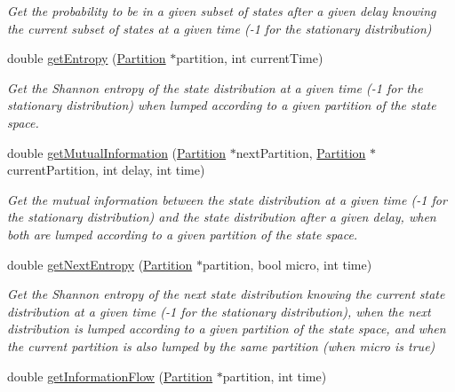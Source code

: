 \begin{DoxyCompactItemize}
\begin{DoxyCompactList}\small\item\em Get the probability to be in a given subset of states after a given delay knowing the current subset of states at a given time (-\/1 for the stationary distribution) \end{DoxyCompactList}\item 
\hypertarget{class_markov_process_ad1d295d33c8abc5bdabea3eeaf33b553}{}double \hyperlink{class_markov_process_ad1d295d33c8abc5bdabea3eeaf33b553}{get\+Entropy} (\hyperlink{class_partition}{Partition} $\ast$partition, int current\+Time)\label{class_markov_process_ad1d295d33c8abc5bdabea3eeaf33b553}

\begin{DoxyCompactList}\small\item\em Get the Shannon entropy of the state distribution at a given time (-\/1 for the stationary distribution) when lumped according to a given partition of the state space. \end{DoxyCompactList}\item 
\hypertarget{class_markov_process_a37aa6fee427f28a0d44dc369a2fd3b6a}{}double \hyperlink{class_markov_process_a37aa6fee427f28a0d44dc369a2fd3b6a}{get\+Mutual\+Information} (\hyperlink{class_partition}{Partition} $\ast$next\+Partition, \hyperlink{class_partition}{Partition} $\ast$current\+Partition, int delay, int time)\label{class_markov_process_a37aa6fee427f28a0d44dc369a2fd3b6a}

\begin{DoxyCompactList}\small\item\em Get the mutual information between the state distribution at a given time (-\/1 for the stationary distribution) and the state distribution after a given delay, when both are lumped according to a given partition of the state space. \end{DoxyCompactList}\item 
\hypertarget{class_markov_process_a85b3be2d849c1b21ad1f98f06816ed76}{}double \hyperlink{class_markov_process_a85b3be2d849c1b21ad1f98f06816ed76}{get\+Next\+Entropy} (\hyperlink{class_partition}{Partition} $\ast$partition, bool micro, int time)\label{class_markov_process_a85b3be2d849c1b21ad1f98f06816ed76}

\begin{DoxyCompactList}\small\item\em Get the Shannon entropy of the next state distribution knowing the current state distribution at a given time (-\/1 for the stationary distribution), when the next distribution is lumped according to a given partition of the state space, and when the current partition is also lumped by the same partition (when micro is true) \end{DoxyCompactList}\item 
\hypertarget{class_markov_process_aec438479d28cc931c022e86971ba7dda}{}double \hyperlink{class_markov_process_aec438479d28cc931c022e86971ba7dda}{get\+Information\+Flow} (\hyperlink{class_partition}{Partition} $\ast$partition, int time)\label{class_markov_process_aec438479d28cc931c022e86971ba7dda}


\end{DoxyCompactItemize}
